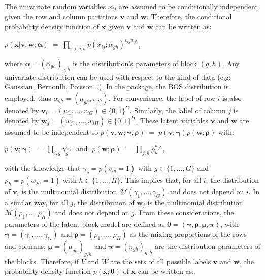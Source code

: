 The univariate random variables $x_{ij}$ are assumed to be conditionally independent given the row and column partitions $\boldsymbol{v}$ and $\boldsymbol{w}$. Therefore, the conditional probability density function of $\boldsymbol{x}$ given $\boldsymbol{v}$ and $\boldsymbol{w}$ can be written as:
\begin{center}
$
  p\left(\boldsymbol{x}|\boldsymbol{v},\boldsymbol{w};\boldsymbol{\alpha}\right) \;=\;
    \underset{i,j,g,h}{\prod}p\left(x_{ij};\alpha_{gh}\right)^{v_{ig}w_{jh}}
$,
\end{center}
where $\boldsymbol{\alpha}=\left(\alpha_{gh}\right)_{g,h}$ is the distribution's parameters of block $\left(g,h\right)$.
Any univariate distribution can be used with respect to the kind of data (e.g: Gaussian, Bernoulli, Poisson...). In the  package, the BOS distribution is employed, thus $\alpha_{gh} = \left(\mu_{gh}, \pi_{gh}\right)$. For convenience, the label of row $i$ is also denoted by $\boldsymbol{v}_{i}=\left(v_{i1},...,v_{iG}\right) \in \{0,1\}^{G}$. Similarly, the label of column $j$ is denoted by $\boldsymbol{w}_{j}=\left(w_{j1},...,w_{iH}\right) \in \{0,1\}^{H}$. These latent variables $\boldsymbol{v}$ and $\boldsymbol{w}$ are assumed to be independent so $p\left(\boldsymbol{v},\boldsymbol{w};\boldsymbol{\gamma},\boldsymbol{\rho}\right) \;=\; p\left(\boldsymbol{v};\boldsymbol{\gamma}\right)p\left(\boldsymbol{w};\boldsymbol{\rho}\right)$ with: 
  \begin{center}
  $
    p\left(\boldsymbol{v};\boldsymbol{\gamma}\right)  \;=\;  
    \underset{i,g}{\prod}\gamma_{g}^{v_{ig}} \; \text{ and } \;
    p\left(\boldsymbol{w};\boldsymbol{\rho}\right)  \;=\; 
    \underset{j,h}{\prod}\rho_{h}^{w_{jh}}
  $,
  \end{center}
\noindent with the knowledge that $\gamma_g = p\left(v_{ig}=1\right)$ with ${g \in \{1,...,G\}}$ and  $\rho_h = p\left(w_{jh}=1\right)$ with $h \in \{1,...,H\}$. This implies that, for all $i$, the distribution of $\boldsymbol{v}_i$ is the multinomial distribution $\mathcal{M} \left(\gamma_1,...,\gamma_G\right)$ and does not depend on $i$. In a similar way, for all $j$, the distribution of $\boldsymbol{w}_j$ is the multinomial distribution $\mathcal{M} \left(\rho_1,...,\rho_H\right)$ and does not depend on $j$. From these considerations, the parameters of the latent block model are defined as $\boldsymbol\theta = \left(\boldsymbol{\gamma},\boldsymbol{\rho},\boldsymbol{\mu},\boldsymbol{\pi}\right)$, with $\boldsymbol{\gamma} = \left(\gamma_1,...,\gamma_G\right)$ and $\boldsymbol{\rho} = \left(\rho_1,...,\rho_H\right)$ as the mixing proportions of the rows and columns; $\boldsymbol{\mu} = \left(\mu_{gh}\right)_{g,h}$ and $\boldsymbol{\pi} = \left(\pi_{gh}\right)_{g,h}$ are the distribution parameters of the blocks. Therefore, if $V$ and $W$ are the sets of all possible labels $\boldsymbol{v}$ and $\boldsymbol{w}$, the probability density function $p\left(\boldsymbol{x};\boldsymbol{\theta}\right)$ of $\boldsymbol{x}$ can be written as: 

